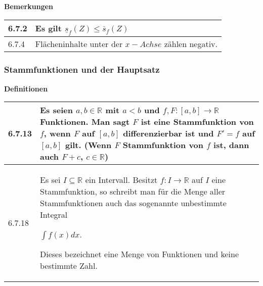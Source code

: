     \noindent
    \textbf{Bemerkungen}
    \begin{table}[H]
    \begin{tabularx}{\textwidth}{X m{16cm}}
        \toprule

        6.7.2 & Es gilt $\underline{s}_f(Z) \leq \bar{s}_f(Z)$\\
        \midrule
        6.7.4 & Flächeninhalte unter der $x-Achse$ zählen negativ. \\

        \bottomrule
    \end{tabularx}
    \end{table}

\subsubsection{Stammfunktionen und der Hauptsatz}

    \noindent
    \textbf{Definitionen}
    \begin{table}[H]  
    \begin{tabularx}{\textwidth}{X m{16cm}}
        \toprule

        6.7.13& Es seien $a,b \in \mathbb{R}$ mit $a<b$ und $f, F: [a,b] \rightarrow \mathbb{R}$ Funktionen. Man sagt $F$ ist eine
                \textbf{Stammfunktion} von $f$, wenn $F$ auf $[a,b]$ differenzierbar ist und $F' = f$ auf $[a,b]$ gilt. \hfill \break
                (Wenn $F$ Stammfunktion von $f$ ist, dann auch $F + c$, $c \in \mathbb{R}$) \\
        \midrule
        6.7.18& Es sei $I \subseteq \mathbb{R}$ ein Intervall. Besitzt $f: I \rightarrow \mathbb{R}$ auf $I$ eine Stammfunktion, so schreibt
                man für die Menge aller Stammfunktionen auch das sogenannte unbestimmte Integral \hfill \break
                \centerline{$ \int f(x) dx $.}
                Dieses bezeichnet eine Menge von Funktionen und keine bestimmte Zahl. \\

        \bottomrule

    \end{tabularx}
    \end{table}

